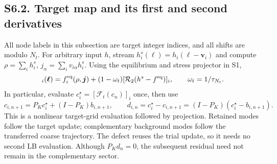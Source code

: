 \documentclass[10pt,letterpaper]{article}
\newcommand{\F}{\mathcal F}\newcommand{\B}{\mathcal B}
\begin{document}
\newpage
\subsection*{S6.2. Target map and its first and second derivatives}
All node labels in this subsection are target integer indices, and all shifts are modulo $N_t$. For arbitrary input $h$, stream $h_i^s(\bm\ell)=h_i(\bm\ell-\bm v_i)$ and compute $\rho=\sum_i h_i^s$, $j_\alpha=\sum_i v_{i\alpha}h_i^s$. Using the equilibrium and stress projector in S1,
\begin{equation}
 [\F_t(h)]_i(\bm\ell)=f_i^{\rm eq}(\rho,\bm j)
 +(1-\omega_t)[\mathcal R_2(h^s-f^{\rm eq})]_i,
 \qquad \omega_t=1/\tau_{N_t}.
 \label{eq:explicitmap}
\end{equation}
In particular, evaluate $c_i^\star=[\F_t(c_n)]_i$ once, then use
\begin{equation}
 c_{i,n+1}=P_Kc_i^\star+(I-P_K)b_{i,n+1},\qquad
 d_{i,n}=c_i^\star-c_{i,n+1}=(I-P_K)(c_i^\star-b_{i,n+1}).
\end{equation}
This is a nonlinear target-grid evaluation followed by projection. Retained modes follow the target update; complementary background modes follow the transferred coarse trajectory. The defect reuses the trial update, so it needs no second LB evaluation. Although $P_Kd_n=0$, the subsequent residual need not remain in the complementary sector.
\end{document}
